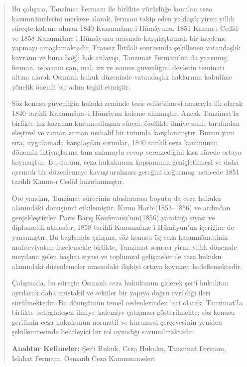 \begin{abstract}
Bu çalışma, Tanzimat Fermanı ile birlikte yürürlüğe konulan ceza kanunnâmelerini merkeze alarak, fermanı takip eden yaklaşık yirmi yıllık süreçte kaleme alınan 1840 Kanunnâme-i Hümâyunu, 1851 Kanun-ı Cedîd ve 1858 Kanunnâme-i Hümâyunu arasında karşılaştırmalı bir inceleme yapmayı amaçlamaktadır. Fransız İhtilali sonrasında şekillenen vatandaşlık kavramı ve buna bağlı hak anlayışı, Tanzimat Fermanı'na da yansımış; ferman, tebaanın can, mal, ırz ve namus güvenliğini devletin teminatı altına alarak Osmanlı hukuk düzeninde vatandaşlık haklarının kabulüne yönelik önemli bir adım teşkil etmiştir.

Söz konusu güvenliğin hukuki zeminde tesis edilebilmesi amacıyla ilk olarak 1840 tarihli Kanunnâme-i Hümâyun kaleme alınmıştır. Ancak Tanzimat’la birlikte hız kazanan kurumsallaşma süreci, özellikle ilmiye sınıfı tarafından eleştirel ve zaman zaman muhalif bir tutumla karşılanmıştır. Bunun yanı sıra, uygulamada karşılaşılan sorunlar, 1840 tarihli ceza kanununun dönemin ihtiyaçlarına tam anlamıyla cevap veremediğini kısa sürede ortaya koymuştur. Bu durum, ceza hukukunun kapsamının genişletilmesi ve daha ayrıntılı bir düzenlemeye kavuşturulması gereğini doğurmuş; neticede 1851 tarihli Kanun-ı Cedîd hazırlanmıştır.

Öte yandan, Tanzimat sürecinin uluslararası boyutu da ceza hukuku alanındaki dönüşümü etkilemiştir. Kırım Harbi(1853–1856) ve ardından gerçekleştirilen Paris Barış Konferansı’nın(1856) yarattığı siyasi ve diplomatik atmosfer, 1858 tarihli Kanunnâme-i Hümâyun’un içeriğine de yansımıştır. Bu bağlamda çalışma, söz konusu üç ceza kanunnâmesinin muhteviyatını incelemekle birlikte, Tanzimat sonrası yirmi yıllık dönemde meydana gelen başlıca siyasi ve toplumsal gelişmeler ile ceza hukuku alanındaki düzenlemeler arasındaki ilişkiyi ortaya koymayı hedeflemektedir.

Çalışmada, bu süreçte Osmanlı ceza hukukunun giderek şer‘î hukuktan ayrılarak daha müstakil ve seküler bir yapıya doğru evrildiği ileri sürülmektedir. Bu dönüşümün temel nedenlerinden biri olarak, Tanzimat’la birlikte belirginleşen ilmiye–kalemiye çatışması gösterilmekte; söz konusu gerilimin ceza hukukunun normatif ve kurumsal çerçevesinin yeniden şekillenmesinde belirleyici bir rol oynadığı savunulmaktadır.

\textbf{Anahtar Kelimeler:} Şer`i Hukuk, Ceza Hukuku, Tanzimat Fermanı, Islahat Fermanı, Osmanlı Ceza Kanunnameleri
\end{abstract}

